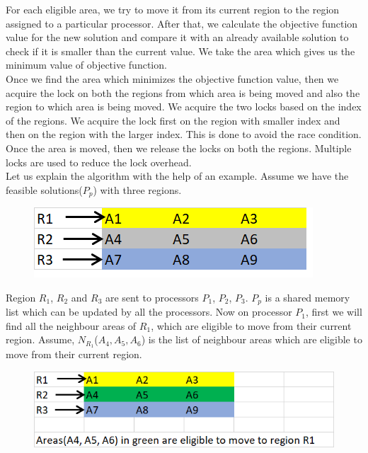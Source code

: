 \documentclass[conference]{IEEEtran}
\begin{document}
For each eligible area, we try to move it from its current region to the region assigned to a particular processor. After that, we calculate the objective function value for the new solution and compare it with an already available solution to check if it is smaller than the current value. We take the area which gives us the minimum value of objective function.\\

Once we find the area which minimizes the objective function value, then we acquire the lock on both the regions from which area is being moved and also the region to which area is being moved. We acquire the two locks based on the index of the regions. We acquire the lock first on the region with smaller index and then on the region with the larger index. This is done to avoid the race condition. Once the area is moved, then we release the locks on both the regions. Multiple locks are used to reduce the lock overhead.\\

Let us explain the algorithm with the help of an example. Assume we have the
feasible solutions($P_p$) with three regions.\\

\begin{figure}[h]
\includegraphics[scale=0.85]{o1.png}
\end{figure}

Region $R_1$, $R_2$ and $R_3$ are sent to processors $P_1$, $P_2$, $P_3$. $P_p$
is a shared memory list which can be updated by all the processors. Now on
processor $P_1$, first we will find all the neighbour areas of $R_1$, which are
eligible to move from their current region. Assume, $N_{R_1}$($A_4, A_5, A_6$) is the list of
neighbour areas which are eligible to move from their current region.\\

\begin{figure}[h]
\includegraphics[scale=0.70]{o2.png}
\end{figure}
\end{document}
